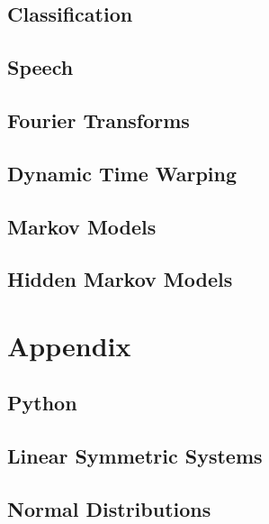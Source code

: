 \documentclass{book}
\begin{document}
\chapter{Classification}


\chapter{Speech}


\chapter{Fourier Transforms}


\chapter{Dynamic Time Warping}


\chapter{Markov Models}


\chapter{Hidden Markov Models}


\appendix

\part{Appendix}

\chapter{Python}


\chapter{Linear Symmetric Systems}


\chapter{Normal Distributions}

\end{document}
